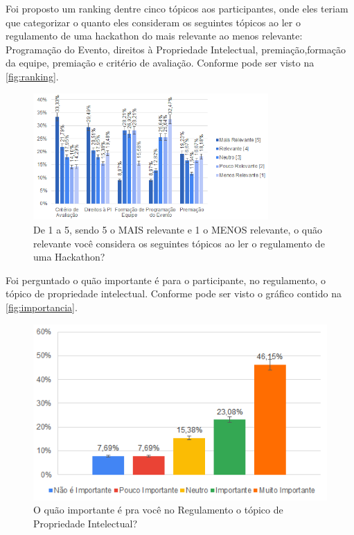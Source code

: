 Foi proposto um ranking dentre cinco tópicos aos participantes, onde eles teriam que categorizar o quanto eles consideram os seguintes tópicos ao ler o regulamento de uma hackathon do mais relevante ao menos relevante: Programação do Evento, direitos à Propriedade Intelectual, premiação,formação da equipe, premiação e critério de avaliação. Conforme pode ser visto na \autoref{fig:ranking}. %

\begin{figure}[H]
    \centering
    \includegraphics[width=0.8\textwidth]{images/ranking.png}%
    \caption{De 1 a 5, sendo 5 o MAIS relevante e 1 o MENOS relevante, o quão relevante você considera os seguintes tópicos ao ler o regulamento de uma Hackathon?}
    \label{fig:ranking}
\end{figure}%



Foi perguntado o quão importante é para o participante, no regulamento, o tópico de propriedade intelectual. Conforme pode ser visto o gráfico contido na \autoref{fig:importancia}.

\begin{figure}[H]
    \centering
    \includegraphics{images/importante.png}
    \caption{O quão importante é pra você no Regulamento o tópico de Propriedade Intelectual?}
    \label{fig:importancia}
\end{figure}


